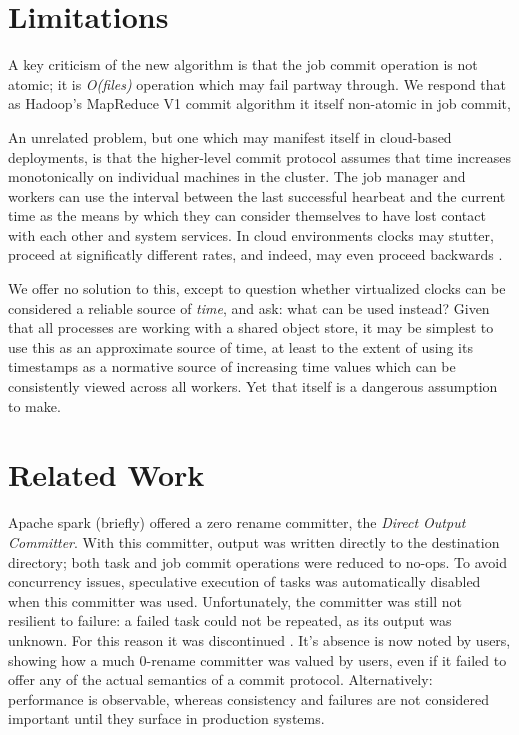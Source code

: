 \documentclass[9pt,technote]{IEEEtran}
\begin{document}
\section{Limitations}

A key criticism of the new algorithm is that the job commit operation is not atomic;
it is \emph{O(files)} operation which may fail partway through. We respond that as Hadoop's MapReduce V1 commit algorithm it itself non-atomic in job commit,

An unrelated problem, but one which may manifest itself in cloud-based deployments, is that the higher-level commit protocol assumes that time increases monotonically on individual machines in the cluster.
The job manager and workers can use the interval between the last successful hearbeat and the current time as the means by which they can consider themselves to have lost contact with each other and system services.
In cloud environments clocks may stutter, proceed at significatly different rates, and indeed, may even proceed backwards \cite{anything?}.

We offer no solution to this, except to question whether virtualized clocks can be considered a reliable source of \emph{time}, and ask: what can be used instead?
Given that all processes are working with a shared object store, it may be simplest to use this as an approximate source of time, at least to the extent of using its timestamps as a normative source of increasing time values which can be consistently viewed across all workers.
Yet that itself is a dangerous assumption to make.


\section{Related Work}

Apache spark (briefly) offered a zero rename committer, the \emph{Direct Output Committer}\cite{JIRA}.
With this committer, output was written directly to the destination directory;
both task and job commit operations were reduced to no-ops.
To avoid concurrency issues, speculative execution of tasks was automatically disabled when this committer was used.
Unfortunately, the committer was still not resilient to failure: a failed task could not be repeated, as its output was unknown.
For this reason it was discontinued \cite{DOC-JIRA}.
It's absence is now noted by users, showing how a much 0-rename committer was valued by users, even if it failed to offer any of the actual semantics of a commit protocol.
Alternatively: performance is observable, whereas consistency and failures are not considered important until they surface in production systems.
\end{document}
